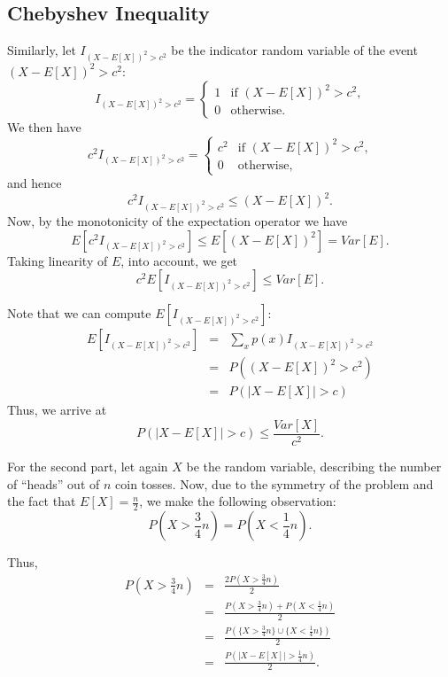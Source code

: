 \subsection{Chebyshev Inequality}
Similarly, let $I_{(X - E[X])^2 > c^2}$ be the indicator random variable of the event $(X - E[X])^2 > c^2$:
\[
    I_{(X - E[X])^2 > c^2} = \begin{cases}
                  1 & \text{if $(X - E[X])^2 > c^2$,} \\
                  0 & \text{otherwise.}
                  \end{cases}
\]
We then have
\[
    c^2I_{(X - E[X])^2 > c^2} = \begin{cases}
                   c^2 & \text{if $(X - E[X])^2 > c^2$,} \\
                   0 & \text{otherwise,}
                   \end{cases}
\]
and hence $$c^2I_{(X - E[X])^2 > c^2} \leq (X - E[X])^2.$$ 
Now, by the monotonicity of the expectation operator we have 
$$E[c^2I_{(X - E[X])^2 > c^2}] \leq E[(X-E[X])^2] = Var[E].$$ Taking linearity of $E$, into account,
we get $$c^2E[I_{(X - E[X])^2 > c^2}] \leq Var[E].$$

Note that we can compute $E[I_{(X - E[X])^2 > c^2}]$:
\begin{eqnarray*}
    E[I_{(X - E[X])^2 > c^2}] &=& \sum_{x}p(x)I_{(X - E[X])^2 > c^2}  \\
                              &=& P\left( (X-E[X])^2 > c^2 \right)    \\
                              &=& P\left( |X-E[X]| > c \right)
\end{eqnarray*}
Thus, we arrive at $$ P(|X-E[X]| > c) \leq \frac{Var[X]}{c^2}.$$

For the second part, let again $X$ be the random variable, describing the 
number of ``heads'' out of $n$ coin tosses. Now, due to the symmetry of the 
problem and the fact that $E[X]=\frac{n}{2}$, we make the following 
observation:
\[ P\left( X > \frac{3}{4}n \right) = P\left( X < \frac{1}{4}n \right).  \]

Thus, 
\begin{eqnarray}
P\left( X > \frac{3}{4}n \right) 
& = & \frac{2P\left(X > \frac{3}{4}n\right)}{2} \\
& = & \frac{P\left(X > \frac{3}{4}n\right) + P\left(X < \frac{1}{4}n\right)}{2} \\
& = & \frac{P\left(\{X > \frac{3}{4}n\} \cup \{X < \frac{1}{4}n\}\right)}{2} \\
& = & \frac{P\left( | X - E[X]| > \frac{1}{4}n \right)}{2}.
\end{eqnarray}

